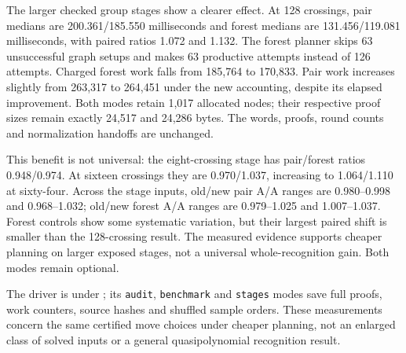 The larger checked group stages show a clearer effect. At 128 crossings,
pair medians are 200.361/185.550 milliseconds and forest medians are
131.456/119.081 milliseconds, with paired ratios 1.072 and 1.132.
The forest planner skips 63 unsuccessful graph setups and makes 63 productive
attempts instead of 126 attempts. Charged forest work falls from 185,764
to 170,833. Pair work increases slightly from 263,317 to 264,451 under the
new accounting, despite its elapsed improvement. Both modes retain 1,017
allocated nodes; their respective proof sizes remain exactly 24,517 and
24,286 bytes. The words, proofs, round counts and normalization handoffs
are unchanged.

This benefit is not universal: the eight-crossing stage has pair/forest
ratios 0.948/0.974. At sixteen crossings they are 0.970/1.037, increasing
to 1.064/1.110 at sixty-four. Across the stage inputs, old/new pair A/A
ranges are 0.980--0.998 and 0.968--1.032; old/new forest A/A ranges are
0.979--1.025 and 1.007--1.037. Forest controls show some systematic variation,
but their largest paired shift is smaller than the 128-crossing result.
The measured evidence supports cheaper planning on larger exposed stages,
not a universal whole-recognition gain. Both modes remain optional.

The driver is  under
; its \texttt{audit}, \texttt{benchmark} and \texttt{stages}
modes save full proofs, work counters, source hashes and shuffled sample
orders. These measurements concern the same certified move choices under
cheaper planning, not an enlarged class of solved inputs or a general
quasipolynomial recognition result.
